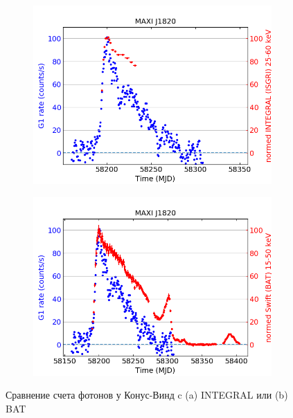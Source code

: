 	\begin{figure}[h!]
		\begin{subfigure}[b]{0.45\textwidth}
			\centering
			\includegraphics[width=\textwidth]{pictures/MAXIJ1820_kwG1_int.png}
			\caption{}
		\end{subfigure}
		\begin{subfigure}[b]{0.45\textwidth}
			\centering
			\includegraphics[width=\textwidth]{pictures/MAXIJ1820_kwG1_bat.png}
			\caption{}				
		\end{subfigure}
		\caption{Сравнение счета фотонов у Конус-Винд c (a) INTEGRAL или (b) BAT}
	\end{figure}

\newpage


